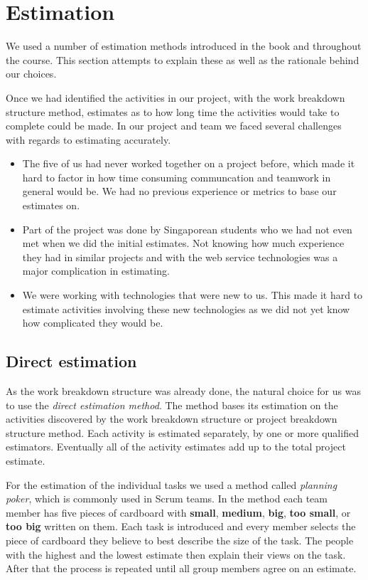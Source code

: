 \section{Estimation}
\label{sec:EmpiriEstimation}

We used a number of estimation methods introduced in the book \cite{caye} and throughout the
course. This section attempts to explain these as well as the rationale behind our choices.

Once we had identified the activities in our project, with the work breakdown structure method,
estimates as to how long time the activities would take to complete could be made. In our project
and team we faced several challenges with regards to estimating accurately.

\begin{itemize}
\item The five of us had never worked together on a project before, which made it hard to factor
    in how time consuming communcation and teamwork in general would be. We had no previous experience
    or metrics to base our estimates on.
    
\item Part of the project was done by Singaporean students who we had not even met when we did the
    initial estimates. Not knowing how much experience they had in similar projects and with the web
    service technologies was a major complication in estimating.
    
\item We were working with technologies that were new to us. This made it hard to estimate activities
    involving these new technologies as we did not yet know how complicated they would be.
\end{itemize}

\subsection{Direct estimation}

As the work breakdown structure was already done, the natural choice for us was to use the \emph{direct
estimation method}\cite{caye}. The method bases its estimation on the activities discovered by the work
breakdown structure or project breakdown structure method. Each activity is  estimated separately, by
one or more qualified estimators. Eventually all of the activity estimates add up to the total project
estimate. 

For the estimation of the individual tasks we used a method called \emph{planning poker}, which is commonly
used in Scrum teams. In the method each team member has five pieces of cardboard with \textbf{small},
\textbf{medium}, \textbf{big}, \textbf{too small}, or \textbf{too big} written on them. Each task is
introduced and every member selects the piece of cardboard they believe to best describe the size of the task.
The people with the highest and the lowest estimate then explain their views on the task. After that the
process is repeated until all group members agree on an estimate.

